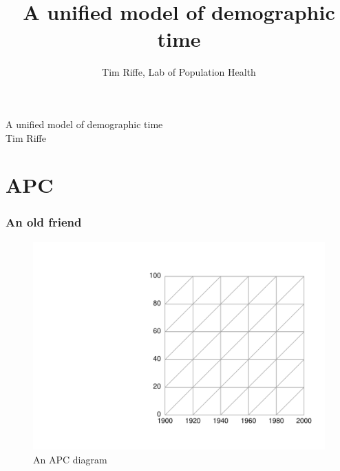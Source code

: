 \documentclass[20pt]{beamer}
\title[APCTDL]{A unified model of demographic time}
\subtitle{Tim Riffe, Lab of Population Health}
\begin{document}

\begin{frame}[plain]

\vspace{3em}
\LARGE A unified model of demographic time\\
\vspace{3 mm}
\normalsize Tim Riffe
\end{frame}



\section{APC}
\begin{frame}
\frametitle{An old friend}
\begin{figure}[b]
    \centering
    \includegraphics[scale=.7]{Figures/LabPres/APC1.pdf}
    \caption{An APC diagram}
\end{figure} 
\end{frame}
\end{document}
